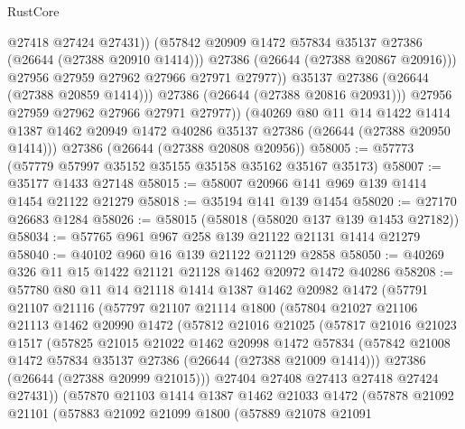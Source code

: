 \begin{lexlean}{RustCore}
\begin{coremodule}
                      @27418
                      @27424
                      @27431))
                  (@57842 @20909 @1472 @57834 @35137 @27386 (@26644 (@27388 @20910 @1414)))
                  @27386
                  (@26644 (@27388 @20867 @20916)))
                @27956
                @27959
                @27962
                @27966
                @27971
                @27977))
            @35137
            @27386
            (@26644 (@27388 @20859 @1414)))
          @27386
          (@26644 (@27388 @20816 @20931)))
        @27956
        @27959
        @27962
        @27966
        @27971
        @27977))
    (@40269
      @80
      @11
      @14
      @1422
      @1414
      @1387
      @1462
      @20949
      @1472
      @40286
      @35137
      @27386
      (@26644 (@27388 @20950 @1414)))
    @27386
    (@26644 (@27388 @20808 @20956))
@58005 := @57773 (@57779 @57997 @35152 @35155 @35158 @35162 @35167 @35173)
@58007 := @35177 @1433 @27148
@58015 := @58007 @20966 @141 @969 @139 @1414 @1454 @21122 @21279
@58018 := @35194 @141 @139 @1454
@58020 := @27170 @26683 @1284
@58026 := @58015 (@58018 (@58020 @137 @139 @1453 @27182))
@58034 := @57765 @961 @967 @258 @139 @21122 @21131 @1414 @21279
@58040 := @40102 @960 @16 @139 @21122 @21129 @2858
@58050 := @40269 @326 @11 @15 @1422 @21121 @21128 @1462 @20972 @1472 @40286
@58208 := @57780
    @80
    @11
    @14
    @21118
    @1414
    @1387
    @1462
    @20982
    @1472
    (@57791
      @21107
      @21116
      (@57797
        @21107
        @21114
        @1800
        (@57804
          @21027
          @21106
          @21113
          @1462
          @20990
          @1472
          (@57812
            @21016
            @21025
            (@57817
              @21016
              @21023
              @1517
              (@57825
                @21015
                @21022
                @1462
                @20998
                @1472
                @57834
                (@57842 @21008 @1472 @57834 @35137 @27386 (@26644 (@27388 @21009 @1414)))
                @27386
                (@26644 (@27388 @20999 @21015)))
              @27404
              @27408
              @27413
              @27418
              @27424
              @27431))
          (@57870
            @21103
            @1414
            @1387
            @1462
            @21033
            @1472
            (@57878
              @21092
              @21101
              (@57883
                @21092
                @21099
                @1800
                (@57889
                  @21078
                  @21091

\end{coremodule}
\end{lexlean}
